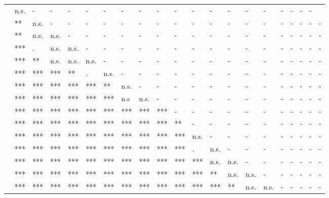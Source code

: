 \documentclass[11pt,fleqn]{article}
\newcommand{\6}{\mbox{$[\hspace*{-.6mm}[$}}
\newcommand{\9}{\mbox{$]\hspace*{-.6mm}]$}}
\begin{document}
\begin{table}[h!]
\begin{tabular}{l l l l l l l l l l l l l l l l l l l l l }
\color{brown}{\em pretend}\color{black}	&  n.s. & - & - & - & - & - & - & - & - & - & - & - & - & - & - & - & - & - & - \\
\color{airforceblue}{\em be right}\color{black}	& ** & n.s. & - & - & - & - & - & - & - & - & - & - & - & - & - & - & - & - & - & - \\
\color{brown}{\em think}\color{black}		& ** & n.s. & n.s. & - & - & - & - & - & - & - & - & - & - & - & - & - & - & - & - & - \\
\color{brown}{\em suggest}\color{black}	& ***	& . & n.s. & n.s. & - & - & - & - & - & - & - & - & - & - & - & - & - & - & - & - \\
\color{brown}{\em say}	\color{black}	& ***	& ** & n.s. & n.s. & n.s. & - & - & - & - & - & - & - & - & - & - & - & - & - & - & - \\
\color{black}{\em prove}\color{black}		& ***	& *** &  ***  & ** & . & n.s. & - & - & - & - & - & - & - & - & - & - & - & - & - & - \\
\color{black}{\em confirm}\color{black}	&***	& ***  &  ***  &  ***  &  ***  & ** & n.s. & - & - & - & - & - & - & - & - & - & - & - & - & - \\
\color{black}{\em establish}\color{black}	&***	&  ***  &  ***  &  ***  &  ***  &  ***  & n.s & n.s. & - & - & - & - & - & - & - & - & - & - & - & - \\
\color{airforceblue}{\em demonstrate}\color{black} &*** & *** & *** & *** &  *** &  *** &  ***  &  ***  &  ***  & - & - & - & - & - & - & - & - & - & - & - \\
\color{black}{\em announce}\color{black}		& ***	& *** & *** & *** & *** & *** & *** &  ***  &  ***  & ** & - & - & - & - & - & - & - & - & - & - \\
\color{black}{\em confess}\color{black}	& ***	& *** & *** & *** & *** & *** & *** & *** & *** &  ***  & n.s. & - & - & - & - & - & - & - & - & - \\
\color{black}{\em admit}\color{black}		& ***	& *** & *** & *** & *** & *** & *** & *** & *** &  ***  & . & n.s. &  - & - & - & - & - & - & - & - \\
\color{blue}{\em reveal}\color{black}			& ***	& *** & *** & *** & *** & *** & *** & *** & *** &  ***  &  ***  & n.s. & n.s. & - & - & - & - & - & - & - \\
\color{black}{\em acknowledge}\color{black}	& ***	& *** & *** & *** & *** & *** & *** & *** & *** &  ***  &  ***  & ** & n.s. & n.s. & - & - & - & - & - & - \\
\color{black}{\em hear}\color{black}		& ***	& *** & *** & *** & *** & *** & *** & *** & *** & *** &  ***  &  ***  & ** & n.s. & n.s. & - & - & - & - & - \\

\end{tabular}
\end{table}
\end{document}

